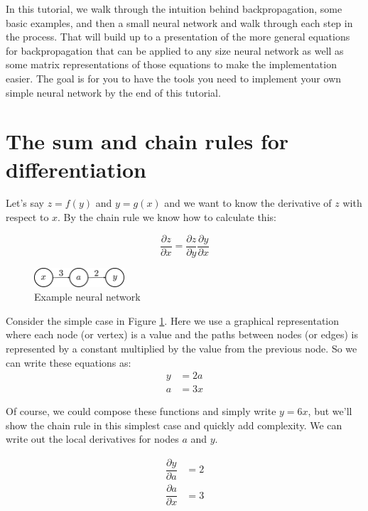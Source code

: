 \documentclass{article}
\begin{document}
In this tutorial, we walk through the intuition behind backpropagation, some basic examples, and then a small neural network and walk through each step in the process. That will build up to a presentation of the more general equations for backpropagation that can be applied to any size neural network as well as some matrix representations of those equations to make the implementation easier. The goal is for you to have the tools you need to implement your own simple neural network by the end of this tutorial.

\section{The sum and chain rules for differentiation}

Let's say $z=f(y)$ and $y=g(x)$ and we want to know the derivative of $z$ with respect to $x$. By the chain rule we know how to calculate this:

\begin{equation}
    \dfrac{\partial z}{\partial x} = \dfrac{\partial z}{\partial y} \dfrac{\partial y}{\partial x}
\end{equation}

\begin{figure}[h]
\centering
\includegraphics[width=0.3\textwidth]{./neural_networks_gradients_ex1.eps}
\caption{Example neural network}
\label{fig:ex1}
\end{figure}

Consider the simple case in Figure \ref{fig:ex1}. Here we use a graphical representation where each node (or vertex) is a value and the paths between nodes (or edges) is represented by a constant multiplied by the value from the previous node. So we can write these equations as:
\begin{align}
    y &= 2a \\
    a &= 3x
\end{align}

Of course, we could compose these functions and simply write $y=6x$, but we'll show the chain rule in this simplest case and quickly add complexity. We can write out the local derivatives for nodes $a$ and $y$.

\begin{align}
    \dfrac{\partial y}{\partial a} &= 2 \\
    \dfrac{\partial a}{\partial x} &= 3
\end{align}
\end{document}
